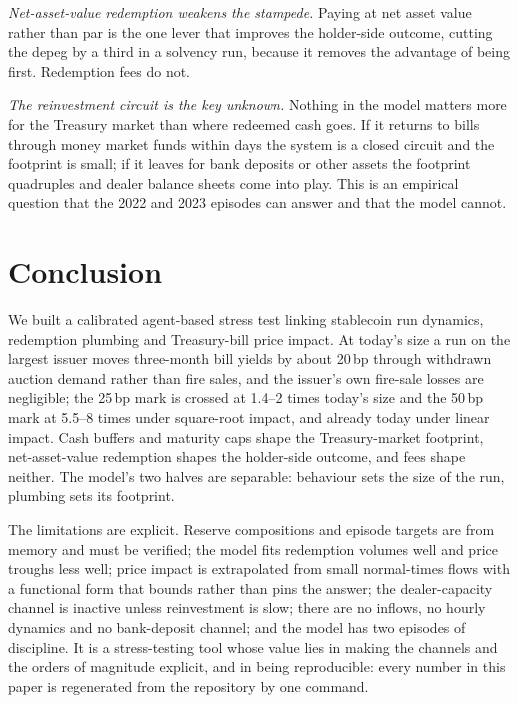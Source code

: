 \emph{Net-asset-value redemption weakens the stampede.} Paying at net asset value rather than par is the one lever
that improves the holder-side outcome, cutting the depeg by a third in a solvency run, because it removes the advantage of
being first. Redemption fees do not.

\emph{The reinvestment circuit is the key unknown.} Nothing in the model matters more for the Treasury market than
where redeemed cash goes. If it returns to bills through money market funds within days the system is a closed
circuit and the footprint is small; if it leaves for bank deposits or other assets the footprint quadruples and
dealer balance sheets come into play. This is an empirical question that the 2022 and 2023 episodes can answer and
that the model cannot.

\section{Conclusion}\label{sec:conclusion}

We built a calibrated agent-based stress test linking stablecoin run dynamics, redemption plumbing and Treasury-bill
price impact. At today's size a run on the largest issuer moves three-month bill yields by about 20\,bp through
withdrawn auction demand rather than fire sales, and the issuer's own fire-sale losses are negligible; the 25\,bp
mark is crossed at 1.4--2 times today's size and the 50\,bp mark at 5.5--8 times under square-root impact, and
already today under linear impact. Cash buffers and maturity caps shape the Treasury-market footprint, net-asset-value
redemption shapes the holder-side outcome, and fees shape neither. The model's two halves are separable: behaviour
sets the size of the run, plumbing sets its footprint.

The limitations are explicit. Reserve compositions and episode targets are from memory and must be verified;
the model fits redemption volumes well and price troughs less well; price impact is extrapolated from small
normal-times flows with a functional form that bounds rather than pins the answer; the dealer-capacity channel is
inactive unless reinvestment is slow; there are no inflows, no hourly dynamics and no bank-deposit channel; and the
model has two episodes of discipline. It is a stress-testing tool whose value lies in making the channels and the
orders of magnitude explicit, and in being reproducible: every number in this paper is regenerated from the
repository by one command.
